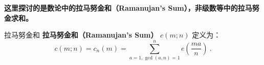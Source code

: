 

\textbf{这里探讨的是数论中的拉马努金和（Ramanujan's Sum），非级数等中的拉马努金求和。}

\begin{definition}{拉马努金和}
\textbf{拉马努金和（Ramanujan's Sum）} $c(m; n)$ 定义为：
\begin{equation}
c(m; n) = c_n(m) = \sum_{a=1, \gcd(a, n)=1}^{n} e\left(\frac{ma}{n}\right) ~.
\end{equation}
\end{definition}



